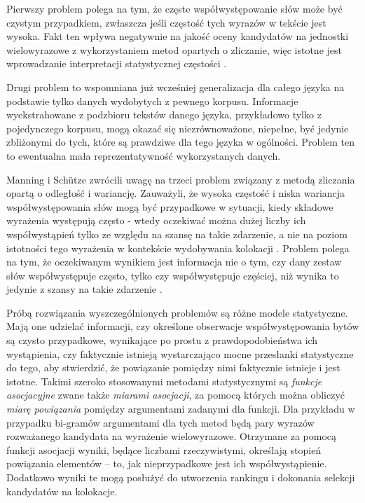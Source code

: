 \par
Pierwszy problem polega na tym, że częste współwystępowanie słów może być czystym przypadkiem, zwłaszcza jeśli częstość tych wyrazów w tekście jest wysoka. 
Fakt ten wpływa negatywnie na jakość oceny kandydatów na jednostki wielowyrazowe z wykorzystaniem metod opartych o zliczanie, więc istotne jest wprowadzanie interpretacji statystycznej częstości \cite[str. 20]{evert}.

\par
Drugi problem to wspomniana już wcześniej generalizacja dla całego języka na podstawie tylko danych wydobytych z pewnego korpusu.
Informacje wyekstrahowane z podzbioru tekstów danego języka, przykładowo tylko z pojedynczego korpusu, mogą okazać się niezrównoważone, niepełne, być jedynie zbliżonymi do tych, które są prawdziwe dla tego języka w ogólności.
Problem ten to ewentualna mała reprezentatywność wykorzystanych danych.

\par
Manning i Schütze zwrócili uwagę na trzeci problem związany z metodą zliczania opartą o odległość i wariancję.
Zauważyli, że wysoka częstość i niska wariancja współwystępowania słów mogą być przypadkowe w sytuacji, kiedy składowe wyrażenia występują często - wtedy oczekiwać można dużej liczby ich współwystąpień tylko ze względu na szansę na takie zdarzenie, a nie na poziom istotności tego wyrażenia w kontekście wydobywania kolokacji \cite[str. 162]{mit}.
Problem polega na tym, że oczekiwanym wynikiem jest informacja nie o tym, czy dany zestaw słów współwystępuje często, tylko czy współwystępuje częściej, niż wynika to jedynie z szansy na takie zdarzenie \cite[162]{mit}.

\par
Próbą rozwiązania wyszczególnionych problemów są różne modele statystyczne.
Mają one udzielać informacji, czy określone obserwacje współwystępowania bytów są czysto przypadkowe, wynikające po prostu z prawdopodobieństwa ich wystąpienia, czy faktycznie istnieją wystarczająco mocne przesłanki statystyczne do tego, aby stwierdzić, że powiązanie pomiędzy nimi faktycznie istnieje i jest istotne. 
Takimi szeroko stosowanymi metodami statystycznymi są \emph{funkcje asocjacyjne} zwane także \emph{miarami asocjacji}, za pomocą których można obliczyć \emph{miarę powiązania} pomiędzy argumentami zadanymi dla funkcji.
Dla przykładu w przypadku bi-gramów argumentami dla tych metod będą pary wyrazów rozważanego kandydata na wyrażenie wielowyrazowe.
Otrzymane za pomocą funkcji asocjacji wyniki, będące liczbami rzeczywistymi, określają stopień powiązania elementów -- to, jak nieprzypadkowe jest ich współwystąpienie. 
Dodatkowo wyniki te mogą posłużyć do utworzenia rankingu i dokonania selekcji kandydatów na kolokacje.

